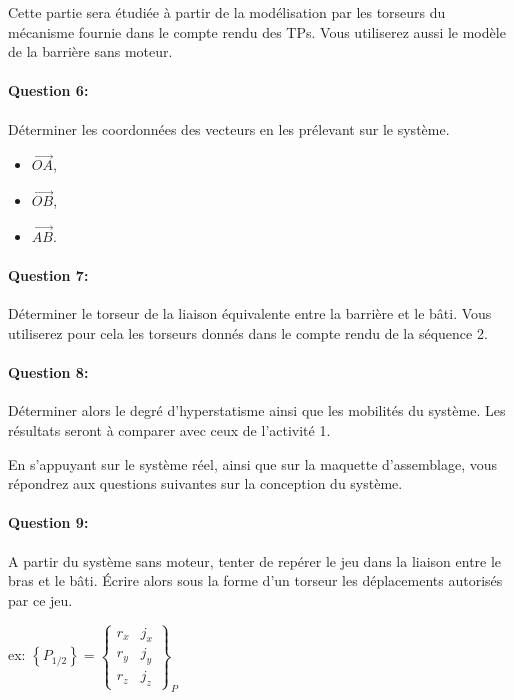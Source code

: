 \cleardoublepage


Cette partie sera étudiée à partir de la modélisation par les torseurs du mécanisme fournie dans le compte rendu des TPs. Vous utiliserez aussi le modèle de la barrière sans moteur.

\paragraph{Question 6:} Déterminer les coordonnées des vecteurs en les prélevant sur le système.
\begin{itemize}
 \item $\overrightarrow{OA}$,
 \item $\overrightarrow{OB}$,
 \item $\overrightarrow{AB}$.
\end{itemize}

\paragraph{Question 7:} Déterminer le torseur de la liaison équivalente entre la barrière et le bâti. Vous utiliserez pour cela les torseurs donnés dans le compte rendu de la séquence 2.

\paragraph{Question 8:} Déterminer alors le degré d'hyperstatisme ainsi que les mobilités du système. Les résultats seront à comparer avec ceux de l'activité 1.

\cleardoublepage


En s'appuyant sur le système réel, ainsi que sur la maquette d'assemblage, vous répondrez aux questions suivantes sur la conception du système.

\paragraph{Question 9:} A partir du système sans moteur, tenter de repérer le jeu dans la liaison entre le bras et le bâti. Écrire alors sous la forme d'un torseur les déplacements autorisés par ce jeu.

ex:
$\left\{P_{1/2}\right\}=\left\{ \begin{array}{cc} r_x & j_x \\ r_y & j_y \\ r_z & j_z \end{array}\right\}_{P}$


